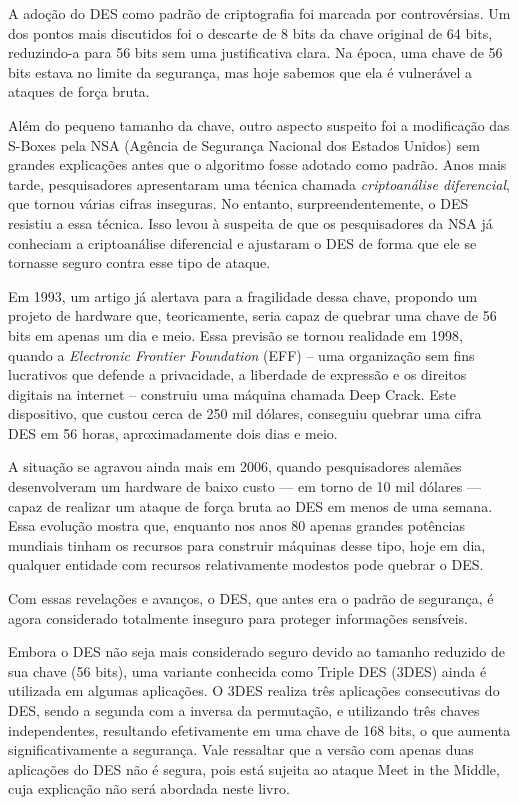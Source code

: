 A adoção do DES como padrão de criptografia foi marcada por controvérsias.
Um dos pontos mais discutidos foi o descarte de 8 bits da chave original de 64 bits, reduzindo-a para 56 bits sem uma justificativa clara.
Na época, uma chave de 56 bits estava no limite da segurança, mas hoje sabemos que ela é vulnerável a ataques de força bruta.

Além do pequeno tamanho da chave, outro aspecto suspeito foi a modificação das S-Boxes pela NSA (Agência de Segurança Nacional dos Estados Unidos) sem grandes explicações antes que o algoritmo fosse adotado como padrão.
Anos mais tarde, pesquisadores apresentaram uma técnica chamada {\em criptoanálise diferencial}, que tornou várias cifras inseguras.
No entanto, surpreendentemente, o DES resistiu a essa técnica.
Isso levou à suspeita de que os pesquisadores da NSA já conheciam a criptoanálise diferencial e ajustaram o DES de forma que ele se tornasse seguro contra esse tipo de ataque.

Em 1993, um artigo já alertava para a fragilidade dessa chave, propondo um projeto de hardware que, teoricamente, seria capaz de quebrar uma chave de 56 bits em apenas um dia e meio.
Essa previsão se tornou realidade em 1998, quando a {\em Electronic Frontier Foundation} (EFF)  -- uma organização sem fins lucrativos que defende a privacidade, a liberdade de expressão e os direitos digitais na internet -- construiu uma máquina chamada Deep Crack.
Este dispositivo, que custou cerca de 250 mil dólares, conseguiu quebrar uma cifra DES em 56 horas, aproximadamente dois dias e meio.

A situação se agravou ainda mais em 2006, quando pesquisadores alemães desenvolveram um hardware de baixo custo — em torno de 10 mil dólares — capaz de realizar um ataque de força bruta ao DES em menos de uma semana.
Essa evolução mostra que, enquanto nos anos 80 apenas grandes potências mundiais tinham os recursos para construir máquinas desse tipo, hoje em dia, qualquer entidade com recursos relativamente modestos pode quebrar o DES.

Com essas revelações e avanços, o DES, que antes era o padrão de segurança, é agora considerado totalmente inseguro para proteger informações sensíveis.

Embora o DES não seja mais considerado seguro devido ao tamanho reduzido de sua chave (56 bits), uma variante conhecida como Triple DES (3DES) ainda é utilizada em algumas aplicações.
O 3DES realiza três aplicações consecutivas do DES, sendo a segunda com a inversa da permutação, e utilizando três chaves independentes, resultando efetivamente em uma chave de 168 bits, o que aumenta significativamente a segurança.
Vale ressaltar que a versão com apenas duas aplicações do DES não é segura, pois está sujeita ao ataque Meet in the Middle, cuja explicação não será abordada neste livro.

